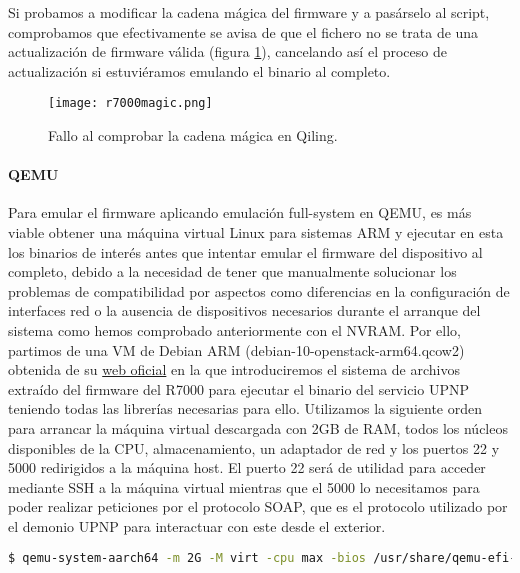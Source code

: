 Si probamos a modificar la cadena mágica del firmware y a pasárselo al script, comprobamos que efectivamente se avisa de que 
el fichero no se trata de una actualización de firmware válida (figura \ref{fig:R7000magic}), cancelando así el proceso de actualización si estuviéramos 
emulando el binario al completo.

\begin{figure}[H]
    \centering
    \texttt{[image: r7000magic.png]}
    \caption{Fallo al comprobar la cadena mágica en Qiling.}
    \label{fig:R7000magic}
\end{figure}

\paragraph{QEMU}
Para emular el firmware aplicando emulación full-system en QEMU, es más viable obtener una máquina virtual Linux para sistemas ARM 
y ejecutar en esta los binarios de interés antes que intentar emular el firmware del dispositivo al completo, debido a la 
necesidad de tener que manualmente solucionar los problemas de compatibilidad por aspectos como diferencias en la configuración 
de interfaces red o la ausencia de dispositivos necesarios durante el arranque del sistema como hemos comprobado anteriormente 
con el NVRAM. Por ello, partimos de una VM de Debian ARM (debian-10-openstack-arm64.qcow2) obtenida de su  
\href{https://cdimage.debian.org/cdimage/cloud/OpenStack/}{web oficial} en la que introduciremos el sistema de archivos extraído del firmware 
del R7000 para ejecutar el binario del servicio UPNP teniendo todas las librerías necesarias para ello. Utilizamos la siguiente 
orden para arrancar la máquina virtual descargada con 2GB de RAM, todos los núcleos disponibles de la CPU, almacenamiento, un 
adaptador de red y los puertos 22 y 5000 redirigidos a la máquina host. El puerto 22 será de utilidad para acceder 
mediante SSH a la máquina virtual mientras que el 5000 lo necesitamos para poder realizar peticiones por el protocolo SOAP, que 
es el protocolo utilizado por el demonio UPNP para interactuar con este desde el exterior.

\begin{lstlisting}[language=bash, breaklines]
    $ qemu-system-aarch64 -m 2G -M virt -cpu max -bios /usr/share/qemu-efi-aarch64/QEMU_EFI.fd -drive if=none,file=debian-10-openstack-arm64.qcow2,id=hd0 -device virtio-blk-device,drive=hd0 -device e1000,netdev=net0 -netdev user,id=net0,hostfwd=tcp:127.0.0.1:1234-:22,hostfwd=tcp::5000-:5000 -nographic
\end{lstlisting}

